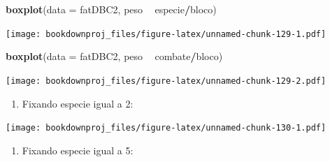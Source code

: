 \documentclass[
]{article}
\newenvironment{Shaded}{\begin{snugshade}}{\end{snugshade}}
\newcommand{\DataTypeTok}[1]{\textcolor[rgb]{0.13,0.29,0.53}{#1}}
\newcommand{\DecValTok}[1]{\textcolor[rgb]{0.00,0.00,0.81}{#1}}
\newcommand{\KeywordTok}[1]{\textcolor[rgb]{0.13,0.29,0.53}{\textbf{#1}}}
\newcommand{\NormalTok}[1]{#1}
\newcommand{\OperatorTok}[1]{\textcolor[rgb]{0.81,0.36,0.00}{\textbf{#1}}}
\newcommand{\StringTok}[1]{\textcolor[rgb]{0.31,0.60,0.02}{#1}}
\providecommand{\tightlist}{%
  \setlength{\itemsep}{0pt}\setlength{\parskip}{0pt}}
\begin{document}
\begin{Shaded}
\begin{Highlighting}[]
\KeywordTok{boxplot}\NormalTok{(}\DataTypeTok{data =}\NormalTok{ fatDBC2, peso }\OperatorTok{~}\StringTok{ }\NormalTok{especie}\OperatorTok{/}\NormalTok{bloco)}
\end{Highlighting}
\end{Shaded}

\texttt{[image: bookdownproj\_files/figure-latex/unnamed-chunk-129-1.pdf]}

\begin{Shaded}
\begin{Highlighting}[]
\KeywordTok{boxplot}\NormalTok{(}\DataTypeTok{data =}\NormalTok{ fatDBC2, peso }\OperatorTok{~}\StringTok{ }\NormalTok{combate}\OperatorTok{/}\NormalTok{bloco)}
\end{Highlighting}
\end{Shaded}

\texttt{[image: bookdownproj\_files/figure-latex/unnamed-chunk-129-2.pdf]}

\begin{enumerate}
\def\labelenumi{\arabic{enumi}.}
\setcounter{enumi}{4}
\tightlist
\item
  Fixando especie igual a 2:
\end{enumerate}

\begin{Shaded}
\end{Shaded}

\texttt{[image: bookdownproj\_files/figure-latex/unnamed-chunk-130-1.pdf]}

\begin{enumerate}
\def\labelenumi{\arabic{enumi}.}
\setcounter{enumi}{5}
\tightlist
\item
  Fixando especie igual a 5:
\end{enumerate}

\begin{Shaded}
\end{Shaded}
\end{document}
